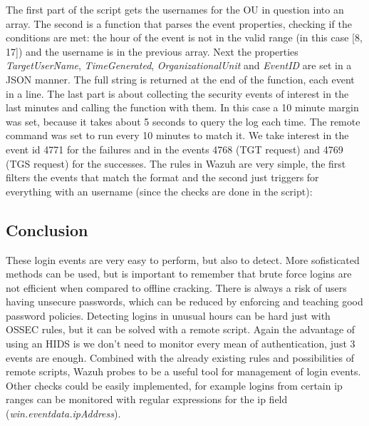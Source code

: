 \linej

\linej
The first part of the script gets the usernames for the OU in question into an array.
\linej
The second is a function that parses the event properties, checking if the conditions are met: the hour of the event is not in the valid range (in this case [8, 17]) and the username is in the previous array.
Next the properties \textit{TargetUserName}, \textit{TimeGenerated}, \textit{OrganizationalUnit} and \textit{EventID} are set in a JSON manner.
The full string is returned at the end of the function, each event in a line.
\linej
The last part is about collecting the security events of interest in the last minutes and calling the function with them. In this case a 10 minute margin was set, because it takes about 5 seconds to query the log each time. The remote command was set to run every 10 minutes to match it.
\linej
We take interest in the event id 4771 for the failures and in the events 4768 (TGT request) and 4769 (TGS request) for the successes\cite{windows_events}.
\linej
\linej
The rules in Wazuh are very simple, the first filters the events that match the format and the second just triggers for everything with an username (since the checks are done in the script):


\subsection{Conclusion}
These login events are very easy to perform, but also to detect.
More sofisticated methods can be used, but is important to remember that brute force logins are not efficient when compared to offline cracking.
There is always a risk of users having unsecure passwords, which can be reduced by enforcing and teaching good password policies.
\linej
Detecting logins in unusual hours can be hard just with OSSEC rules, but it can be solved with a remote script.
\linej
\linej
Again the advantage of using an HIDS is we don't need to monitor every mean of authentication, just 3 events are enough. Combined with the already existing rules and possibilities of remote scripts, Wazuh probes to be a useful tool for management of login events. Other checks could be easily implemented, for example logins from certain ip ranges can be monitored with regular expressions for the ip field (\textit{win.eventdata.ipAddress}).
